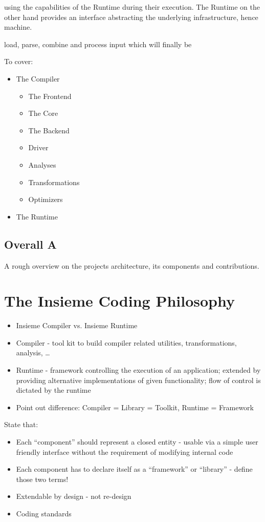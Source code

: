  using the
capabilities of the Runtime during their execution. The Runtime on the other hand provides an interface
abstracting the underlying infrastructure, hence machine.

load, parse, combine and process input
which will finally be 


To cover:
\begin{itemize}
  \item The Compiler
  \begin{itemize}
    \item The Frontend
    \item The Core
    \item The Backend
    \item Driver 
    \item Analyses
    \item Transformations
    \item Optimizers
  \end{itemize} 	
  \item The Runtime
\end{itemize}



\subsection{Overall A}


A rough overview on the projects architecture, its components and contributions.

\section{The Insieme Coding Philosophy}


\begin{itemize}
  \item Insieme Compiler vs. Insieme Runtime
  \item Compiler - tool kit to build compiler related utilities,
  transformations, analysis, \ldots
  \item Runtime - framework controlling the execution of an application;
  extended by providing alternative implementations of given functionality; flow
  of control is dictated by the runtime
  \item Point out difference: Compiler = Library = Toolkit, Runtime = Framework
\end{itemize}


State that:
\begin{itemize}
  \item Each ``component'' should represent a closed entity - usable via a simple
  user friendly interface without the requirement of modifying internal code
  \item Each component has to declare itself as a ``framework'' or ``library'' -
  define those two terms!
  \item Extendable by design - not re-design
  \item Coding standards
\end{itemize}